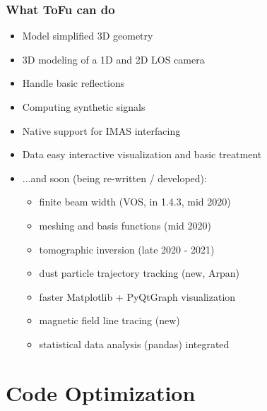 \documentclass[10pt]{beamer}
\begin{document}
%

\begin{frame}
\frametitle{What ToFu can do}
\begin{itemize}
	\item Model simplified 3D geometry
	\item 3D modeling of a 1D and 2D LOS camera
	\item Handle basic reflections
	\item Computing synthetic signals
	\item Native support for IMAS interfacing
	\item Data easy interactive visualization and basic treatment
	\pause
	\item ...and soon (being re-written / developed):
		\begin{itemize}
			\item finite beam width (VOS, in 1.4.3, mid 2020)
			\item meshing and basis functions (mid 2020)
			\item tomographic inversion (late 2020 - 2021)
			\item dust particle trajectory tracking (new, Arpan)
			\item faster Matplotlib + PyQtGraph visualization
			\item magnetic field line tracing (new)
			\item statistical data analysis (pandas) integrated
		\end{itemize}
\end{itemize}
\end{frame}


\section{Code Optimization}
\end{document}
